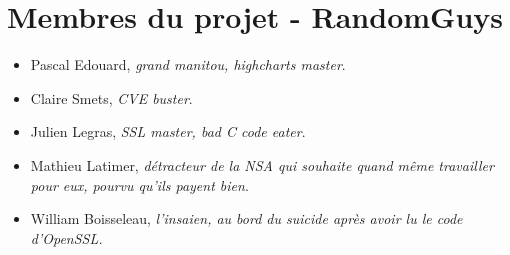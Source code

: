 \documentclass[a4paper,11pt,french]{article}
\begin{document}
\section{Membres du projet - RandomGuys}
\begin{itemize}
\item Pascal Edouard, \textit{grand manitou, highcharts master}.
\item Claire Smets, \textit{CVE buster}.
\item Julien Legras, \textit{SSL master, bad C code eater}.
\item Mathieu Latimer, \textit{détracteur de la NSA qui souhaite quand même travailler pour eux, pourvu qu'ils payent bien}.
\item William Boisseleau, \textit{l'insaien, au bord du suicide après avoir lu le code d'OpenSSL.}
\end{itemize}

 
\end{document}
